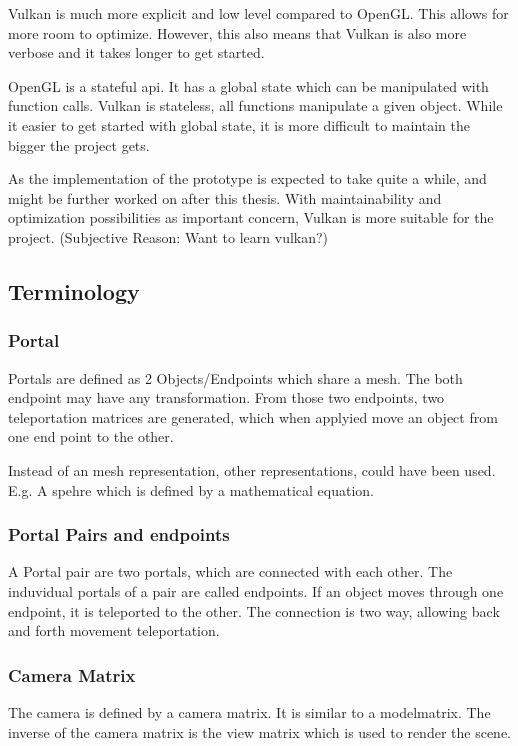 Vulkan is much more explicit and low level compared to OpenGL. This allows for more room to optimize. However, this also means that Vulkan is also more verbose and it takes longer to get started.

OpenGL is a stateful \gls{api}. It has a global state which can be manipulated with function calls. Vulkan is stateless, all functions manipulate a given object. While it easier to get started with global state, it is more difficult to maintain the bigger the project gets.

As the implementation of the prototype is expected to take quite a while, and might be further worked on after this thesis. With maintainability and optimization possibilities as important concern, Vulkan is more suitable for the project. 
(Subjective Reason: Want to learn vulkan?) 

\subsection{Terminology}

\subsubsection{Portal}
Portals are defined as 2 Objects/Endpoints which share a mesh. The both endpoint may have any transformation. From those two endpoints, two teleportation matrices are generated, which when applyied move an object from one end point to the other.

Instead of an mesh representation, other representations, could have been used. E.g. A spehre which is defined by a mathematical equation.

\subsubsection{Portal Pairs and endpoints}
A Portal pair are two portals, which are connected with each other. The induvidual portals of a pair are called endpoints. If an object moves through one endpoint, it is teleported to the other. The connection is two way, allowing back and forth movement teleportation. 



\subsubsection{Camera Matrix}
The camera is defined by a camera matrix. It is similar to a modelmatrix. The inverse of the camera matrix is the view matrix which is used to render the scene.

